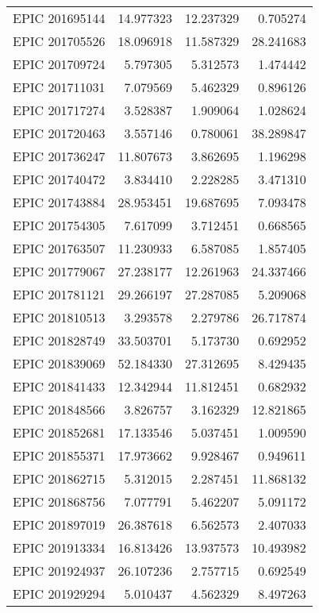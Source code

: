 \begin{tabular}{lrrr}
 EPIC 201695144 &  14.977323 &  12.237329 &   0.705274 \\
 EPIC 201705526 &  18.096918 &  11.587329 &  28.241683 \\
 EPIC 201709724 &   5.797305 &   5.312573 &   1.474442 \\
 EPIC 201711031 &   7.079569 &   5.462329 &   0.896126 \\
 EPIC 201717274 &   3.528387 &   1.909064 &   1.028624 \\
 EPIC 201720463 &   3.557146 &   0.780061 &  38.289847 \\
 EPIC 201736247 &  11.807673 &   3.862695 &   1.196298 \\
 EPIC 201740472 &   3.834410 &   2.228285 &   3.471310 \\
 EPIC 201743884 &  28.953451 &  19.687695 &   7.093478 \\
 EPIC 201754305 &   7.617099 &   3.712451 &   0.668565 \\
 EPIC 201763507 &  11.230933 &   6.587085 &   1.857405 \\
 EPIC 201779067 &  27.238177 &  12.261963 &  24.337466 \\
 EPIC 201781121 &  29.266197 &  27.287085 &   5.209068 \\
 EPIC 201810513 &   3.293578 &   2.279786 &  26.717874 \\
 EPIC 201828749 &  33.503701 &   5.173730 &   0.692952 \\
 EPIC 201839069 &  52.184330 &  27.312695 &   8.429435 \\
 EPIC 201841433 &  12.342944 &  11.812451 &   0.682932 \\
 EPIC 201848566 &   3.826757 &   3.162329 &  12.821865 \\
 EPIC 201852681 &  17.133546 &   5.037451 &   1.009590 \\
 EPIC 201855371 &  17.973662 &   9.928467 &   0.949611 \\
 EPIC 201862715 &   5.312015 &   2.287451 &  11.868132 \\
 EPIC 201868756 &   7.077791 &   5.462207 &   5.091172 \\
 EPIC 201897019 &  26.387618 &   6.562573 &   2.407033 \\
 EPIC 201913334 &  16.813426 &  13.937573 &  10.493982 \\
 EPIC 201924937 &  26.107236 &   2.757715 &   0.692549 \\
 EPIC 201929294 &   5.010437 &   4.562329 &   8.497263 \\
\bottomrule
\end{tabular}
